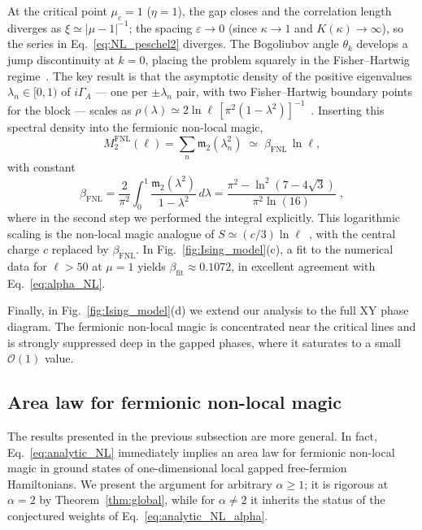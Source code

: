 \documentclass[prx,twocolumn,superscriptaddress,aps,10pt, frontmatterverbose, reprint,footinbib,longbibliography=true]{revtex4-2}
\newcommand{\RENYI}{\alpha}
\begin{document}
At the critical point $\mu_c=1$ ($\eta=1$), the gap closes and the correlation length diverges as $\xi\simeq |\mu-1|^{-1}$; the spacing $\varepsilon \to 0$ (since $\kappa \to 1$ and $K(\kappa) \to \infty$), so the series in Eq.~\eqref{eq:NL_peschel2} diverges.
The Bogoliubov angle $\theta_k$ develops a jump discontinuity at $k = 0$, placing the problem squarely in the Fisher--Hartwig regime~\cite{Jin_2004}.
The key result is that the asymptotic density of the positive eigenvalues $\lambda_n \in [0,1)$  of $i\Gamma_A$ --- one per $\pm\lambda_n$ pair, with two Fisher--Hartwig boundary points for the block --- scales as $\rho(\lambda) \simeq 2\ln\ell\,[\pi^2(1-\lambda^2)]^{-1}$~\cite{Its_2005}.
Inserting this spectral density into the fermionic non-local magic,
\begin{equation}
    M_2^{\mathrm{FNL}}(\ell) = \sum_{n} \mathfrak{m}_2(\lambda_n^2)\;\simeq\; \beta_{\mathrm{FNL}}\,\ln\ell,
\end{equation}
with constant
\begin{equation}
    \beta_{\mathrm{FNL}} = \frac{2}{\pi^2}\int_{0}^{1} \frac{\mathfrak{m}_2(\lambda^2)}{1-\lambda^2}\, d\lambda= \frac{\pi ^2-\ln ^2\left(7-4 \sqrt{3}\right)}{\pi ^2 \ln (16)}\;,
    \label{eq:alpha_NL}
\end{equation}
where in the second step we performed the integral explicitly.
This logarithmic scaling is the non-local magic analogue of $S \simeq (c/3)\ln\ell$~\cite{Calabrese2004entanglement}, with the central charge $c$ replaced by $\beta_{\mathrm{FNL}}$.
In Fig.~\ref{fig:Ising_model}(c), a fit to the numerical data for $\ell > 50$ at $\mu = 1$ yields $\beta_{\mathrm{fit}} \approx 0.1072$, in excellent agreement with Eq.~\eqref{eq:alpha_NL}.

Finally, in Fig.~\ref{fig:Ising_model}(d) we extend our analysis to the full XY phase diagram. The fermionic non-local magic is concentrated near the critical lines and is strongly suppressed deep in the gapped phases, where it saturates to a small $\mathcal{O}(1)$ value.

\subsection{Area law for fermionic non-local magic}
\label{sec:FNL_area_law}
The results presented in the previous subsection are more general. In fact,  Eq.~\eqref{eq:analytic_NL} immediately implies an area law for fermionic non-local magic in ground states of one-dimensional local gapped free-fermion Hamiltonians. We present the argument for arbitrary $\RENYI\ge1$; it is rigorous at $\RENYI=2$ by Theorem~\ref{thm:global}, while for $\RENYI\neq2$ it inherits the status of the conjectured weights of Eq.~\eqref{eq:analytic_NL_alpha}.
\end{document}
